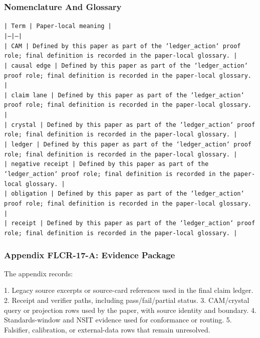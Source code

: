 \documentclass[11pt]{article}
\begin{document}
\subsubsection*{Nomenclature And Glossary}

\noindent\texttt{| Term | Paper-local meaning |}\\
\noindent\texttt{|---|---|}\\
\noindent\texttt{| CAM | Defined by this paper as part of the `ledger\_action` proof role; final definition is recorded in the paper-local glossary. |}\\
\noindent\texttt{| causal edge | Defined by this paper as part of the `ledger\_action` proof role; final definition is recorded in the paper-local glossary. |}\\
\noindent\texttt{| claim lane | Defined by this paper as part of the `ledger\_action` proof role; final definition is recorded in the paper-local glossary. |}\\
\noindent\texttt{| crystal | Defined by this paper as part of the `ledger\_action` proof role; final definition is recorded in the paper-local glossary. |}\\
\noindent\texttt{| ledger | Defined by this paper as part of the `ledger\_action` proof role; final definition is recorded in the paper-local glossary. |}\\
\noindent\texttt{| negative receipt | Defined by this paper as part of the `ledger\_action` proof role; final definition is recorded in the paper-local glossary. |}\\
\noindent\texttt{| obligation | Defined by this paper as part of the `ledger\_action` proof role; final definition is recorded in the paper-local glossary. |}\\
\noindent\texttt{| receipt | Defined by this paper as part of the `ledger\_action` proof role; final definition is recorded in the paper-local glossary. |}\\

\subsubsection*{Appendix FLCR-17-A: Evidence Package}

The appendix records:

1. Legacy source excerpts or source-card references used in the final claim ledger.
2. Receipt and verifier paths, including pass/fail/partial status.
3. CAM/crystal query or projection rows used by the paper, with source identity and boundary.
4. Standards-window and NSIT evidence used for conformance or routing.
5. Falsifier, calibration, or external-data rows that remain unresolved.
\end{document}
